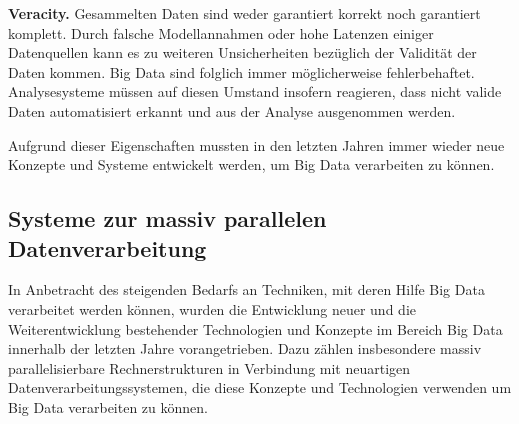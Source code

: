 \textbf{Veracity.} Gesammelten Daten sind weder garantiert korrekt noch garantiert komplett. Durch falsche Modellannahmen oder hohe Latenzen einiger Datenquellen kann es zu weiteren Unsicherheiten bezüglich der Validität der Daten kommen. Big Data sind folglich immer möglicherweise fehlerbehaftet. Analysesysteme müssen auf diesen Umstand insofern reagieren, dass nicht valide Daten automatisiert erkannt und aus der Analyse ausgenommen werden.

Aufgrund dieser Eigenschaften mussten in den letzten Jahren immer wieder neue Konzepte und Systeme entwickelt werden, um Big Data verarbeiten zu können. 

\subsection{Systeme zur massiv parallelen Datenverarbeitung}
\label{sec:GrosseDatenmengen}
In Anbetracht des steigenden Bedarfs an Techniken, mit deren Hilfe Big Data verarbeitet werden können, wurden die Entwicklung neuer und die Weiterentwicklung bestehender Technologien und Konzepte im Bereich Big Data innerhalb der letzten Jahre vorangetrieben. Dazu zählen insbesondere massiv parallelisierbare Rechnerstrukturen in Verbindung mit neuartigen Datenverarbeitungssystemen, die diese Konzepte und Technologien verwenden um Big Data verarbeiten zu können. 

